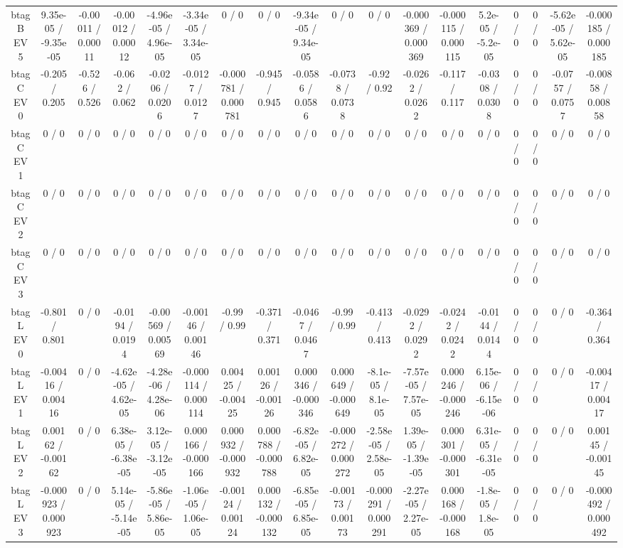 \documentclass[10pt]{article}
\begin{document}
\begin{table}[htbp]
\begin{center}
\begin{tabular}{|c|c|c|c|c|c|c|c|c|c|c|c|c|c|c|c|c|c|}
  btag B EV 5 & 9.35e-05 / -9.35e-05 & -0.00011 / 0.00011 & -0.00012 / 0.00012 & -4.96e-05 / 4.96e-05 & -3.34e-05 / 3.34e-05 & 0 / 0 & 0 / 0 & -9.34e-05 / 9.34e-05 & 0 / 0 & 0 / 0 & -0.000369 / 0.000369 & -0.000115 / 0.000115 & 5.2e-05 / -5.2e-05 & 0 / 0 & 0 / 0 & -5.62e-05 / 5.62e-05 & -0.000185 / 0.000185 \\ 
  btag C EV 0 & -0.205 / 0.205 & -0.526 / 0.526 & -0.062 / 0.062 & -0.0206 / 0.0206 & -0.0127 / 0.0127 & -0.000781 / 0.000781 & -0.945 / 0.945 & -0.0586 / 0.0586 & -0.0738 / 0.0738 & -0.92 / 0.92 & -0.0262 / 0.0262 & -0.117 / 0.117 & -0.0308 / 0.0308 & 0 / 0 & 0 / 0 & -0.0757 / 0.0757 & -0.00858 / 0.00858 \\ 
  btag C EV 1 & 0 / 0 & 0 / 0 & 0 / 0 & 0 / 0 & 0 / 0 & 0 / 0 & 0 / 0 & 0 / 0 & 0 / 0 & 0 / 0 & 0 / 0 & 0 / 0 & 0 / 0 & 0 / 0 & 0 / 0 & 0 / 0 & 0 / 0 \\ 
  btag C EV 2 & 0 / 0 & 0 / 0 & 0 / 0 & 0 / 0 & 0 / 0 & 0 / 0 & 0 / 0 & 0 / 0 & 0 / 0 & 0 / 0 & 0 / 0 & 0 / 0 & 0 / 0 & 0 / 0 & 0 / 0 & 0 / 0 & 0 / 0 \\ 
  btag C EV 3 & 0 / 0 & 0 / 0 & 0 / 0 & 0 / 0 & 0 / 0 & 0 / 0 & 0 / 0 & 0 / 0 & 0 / 0 & 0 / 0 & 0 / 0 & 0 / 0 & 0 / 0 & 0 / 0 & 0 / 0 & 0 / 0 & 0 / 0 \\ 
  btag L EV 0 & -0.801 / 0.801 & 0 / 0 & -0.0194 / 0.0194 & -0.00569 / 0.00569 & -0.00146 / 0.00146 & -0.99 / 0.99 & -0.371 / 0.371 & -0.0467 / 0.0467 & -0.99 / 0.99 & -0.413 / 0.413 & -0.0292 / 0.0292 & -0.0242 / 0.0242 & -0.0144 / 0.0144 & 0 / 0 & 0 / 0 & 0 / 0 & -0.364 / 0.364 \\ 
  btag L EV 1 & -0.00416 / 0.00416 & 0 / 0 & -4.62e-05 / 4.62e-05 & -4.28e-06 / 4.28e-06 & -0.000114 / 0.000114 & 0.00425 / -0.00425 & 0.00126 / -0.00126 & 0.000346 / -0.000346 & 0.000649 / -0.000649 & -8.1e-05 / 8.1e-05 & -7.57e-05 / 7.57e-05 & 0.000246 / -0.000246 & 6.15e-06 / -6.15e-06 & 0 / 0 & 0 / 0 & 0 / 0 & -0.00417 / 0.00417 \\ 
  btag L EV 2 & 0.00162 / -0.00162 & 0 / 0 & 6.38e-05 / -6.38e-05 & 3.12e-05 / -3.12e-05 & 0.000166 / -0.000166 & 0.000932 / -0.000932 & 0.000788 / -0.000788 & -6.82e-05 / 6.82e-05 & -0.000272 / 0.000272 & -2.58e-05 / 2.58e-05 & 1.39e-05 / -1.39e-05 & 0.000301 / -0.000301 & 6.31e-05 / -6.31e-05 & 0 / 0 & 0 / 0 & 0 / 0 & 0.00145 / -0.00145 \\ 
  btag L EV 3 & -0.000923 / 0.000923 & 0 / 0 & 5.14e-05 / -5.14e-05 & -5.86e-05 / 5.86e-05 & -1.06e-05 / 1.06e-05 & -0.00124 / 0.00124 & 0.000132 / -0.000132 & -6.85e-05 / 6.85e-05 & -0.00173 / 0.00173 & -0.000291 / 0.000291 & -2.27e-05 / 2.27e-05 & 0.000168 / -0.000168 & -1.8e-05 / 1.8e-05 & 0 / 0 & 0 / 0 & 0 / 0 & -0.000492 / 0.000492 \\ 

\end{tabular}
\end{center}
\end{table}
\end{document}
